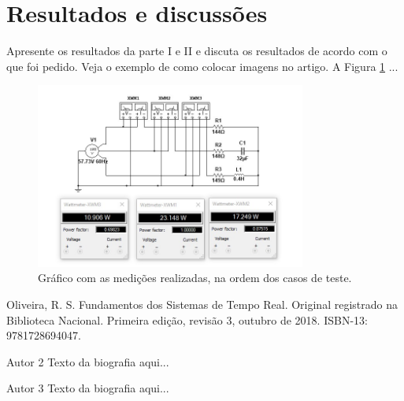 \documentclass[journal]{IEEEtran}
\begin{document}
\section{Resultados e discussões}

Apresente os resultados da parte I e II e discuta os resultados de acordo com o que foi pedido. Veja o exemplo de como colocar imagens no artigo. A Figura \ref{fig1} ...

	\begin{figure}[h]
	\centering
	\includegraphics[width=3.5in]{Imagens/medidas.jpg}	
	\caption{Gráfico com as medições realizadas, na ordem dos casos de teste.}
	\label{fig1}
\end{figure}


\ifCLASSOPTIONcaptionsoff
  \newpage
\fi

\begin{thebibliography}{1}

Oliveira, R. S. Fundamentos dos Sistemas de Tempo Real. Original registrado na Biblioteca Nacional. Primeira edição, revisão 3, outubro de 2018. ISBN-13: 9781728694047.

\end{thebibliography}


\begin{IEEEbiographynophoto}{Autor 2}
Texto da biografia aqui...
\end{IEEEbiographynophoto}


\begin{IEEEbiographynophoto}{Autor 3}
Texto da biografia aqui...
\end{IEEEbiographynophoto}
\end{document}
